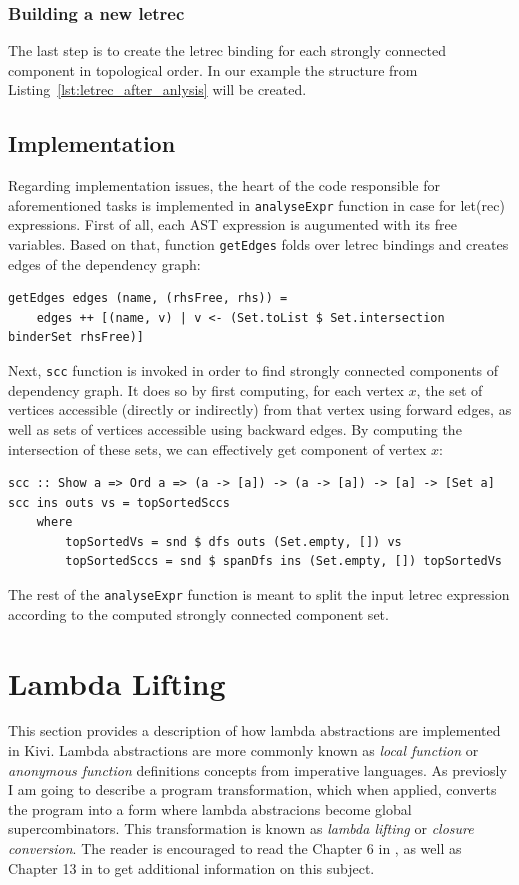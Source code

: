 \documentclass[12pt,a4paper]{report}
\begin{document}
\subsubsection{Building a new letrec}
The last step is to create the letrec binding for each strongly
connected component in topological order. In our example the structure from
Listing~\ref{lst:letrec_after_anlysis} will be created.


\subsection{Implementation}
Regarding implementation issues, the heart of the code responsible for
aforementioned tasks is implemented in \texttt{analyseExpr} function in case
for let(rec) expressions. First of all, each AST expression is
augumented with its free variables. Based on that, function \texttt{getEdges}
folds over letrec bindings and creates edges of the dependency graph:

\vspace*{0.2in}
\begin{lstlisting}[style=haskell]
getEdges edges (name, (rhsFree, rhs)) =
    edges ++ [(name, v) | v <- (Set.toList $ Set.intersection binderSet rhsFree)]
\end{lstlisting}

Next, \texttt{scc} function is invoked in order to find strongly connected
components of dependency graph. It does so by first computing, for each vertex
$x$, the set of vertices accessible (directly or indirectly) from that vertex
using forward edges, as well as sets of vertices accessible using backward
edges. By computing the intersection of these sets, we can effectively get
component of vertex $x$:

\vspace*{0.2in}
\begin{lstlisting}[style=haskell]
scc :: Show a => Ord a => (a -> [a]) -> (a -> [a]) -> [a] -> [Set a]
scc ins outs vs = topSortedSccs
    where
        topSortedVs = snd $ dfs outs (Set.empty, []) vs
        topSortedSccs = snd $ spanDfs ins (Set.empty, []) topSortedVs
\end{lstlisting}

The rest of the \texttt{analyseExpr} function is meant to split the input
letrec expression according to the computed strongly connected
component set.

\section{Lambda Lifting}
\label{sec:lambda_lifting}
This section provides a description of how lambda abstractions are implemented
in Kivi. Lambda abstractions are more commonly known as \textit{local function}
or \textit{anonymous function} definitions concepts from imperative languages.
As previosly I am going to describe a program transformation, which when
applied, converts the program into a form where lambda abstracions become
global supercombinators. This transformation is known as \textit{lambda
lifting} or \textit{closure conversion}. The reader is encouraged to read the
Chapter 6 in \cite{JonLes00}, as well as Chapter 13 in \cite{Jon87} to
get additional information on this subject.
\end{document}
